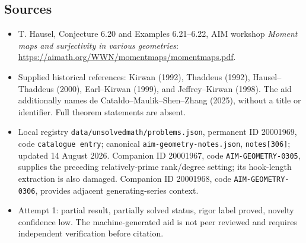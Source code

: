 \documentclass[11pt]{article}
\begin{document}
\subsection{Sources}
\begin{itemize}
\item T. Hausel, Conjecture 6.20 and Examples 6.21--6.22, AIM workshop \emph{Moment maps and surjectivity in various geometries}: \url{https://aimath.org/WWN/momentmaps/momentmaps.pdf}.
\item Supplied historical references: Kirwan (1992), Thaddeus (1992), Hausel--Thaddeus (2000), Earl--Kirwan (1999), and Jeffrey--Kirwan (1998). The aid additionally names de Cataldo--Maulik--Shen--Zhang (2025), without a title or identifier. Full theorem statements are absent.
\item Local registry \texttt{data/unsolvedmath/problems.json}, permanent ID 20001969, code \texttt{catalogue entry}; canonical \texttt{aim-geometry-notes.json}, \texttt{notes[306]}; updated 14 August 2026. Companion ID 20001967, code \texttt{AIM-GEOMETRY-0305}, supplies the preceding relatively-prime rank/degree setting; its hook-length extraction is also damaged. Companion ID 20001968, code \texttt{AIM-GEOMETRY-0306}, provides adjacent generating-series context.
\item Attempt 1: partial result, partially solved status, rigor label proved, novelty confidence low. The machine-generated aid is not peer reviewed and requires independent verification before citation.
\end{itemize}
\end{document}
